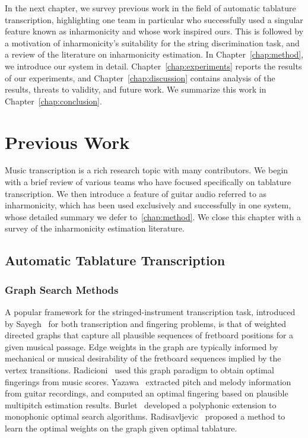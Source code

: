 \documentclass[12pt]{cmuthesis}
\begin{document}
In the next chapter, we survey previous work in the field of automatic tablature transcription, highlighting one team in particular who successfully used a singular feature known as inharmonicity and whose work inspired ours. This is followed by a motivation of inharmonicity's suitability for the string discrimination task, and a review of the literature on inharmonicity estimation. In Chapter~\ref{chap:method}, we introduce our system in detail. Chapter~\ref{chap:experiments} reports the results of our experiments, and Chapter~\ref{chap:discussion} contains analysis of the results, threats to validity, and future work. We summarize this work in Chapter~\ref{chap:conclusion}.

\noindent
\chapter{Previous Work}
\label{chap:lit-review}
Music transcription is a rich research topic with many contributors. We begin with a brief review of various teams who have focused specifically on tablature transcription. We then introduce a feature of guitar audio referred to as inharmonicity, which has been used exclusively and successfully in one system, whose detailed summary we defer to~\ref{chap:method}. We close this chapter with a survey of the inharmonicity estimation literature.

\section{Automatic Tablature Transcription}
\subsection{Graph Search Methods}
A popular framework for the stringed-instrument transcription task, introduced by Sayegh~\cite{sayegh1989} for both transcription and fingering problems, is that of weighted directed graphs that capture all plausible sequences of fretboard positions for a given musical passage. Edge weights in the graph are typically informed by mechanical or musical desirability of the fretboard sequences implied by the vertex transitions. Radicioni~\cite{radicioni2005} used this graph paradigm to obtain optimal fingerings from music scores. Yazawa~\cite{yazawa2013} extracted pitch and melody information from guitar recordings, and computed an optimal fingering based on plausible multipitch estimation results. Burlet~\cite{burlet2013} developed a polyphonic extension to monophonic optimal search algorithms. Radisavljevic~\cite{radisav2004} proposed a method to learn the optimal weights on the graph given optimal tablature.
\end{document}
